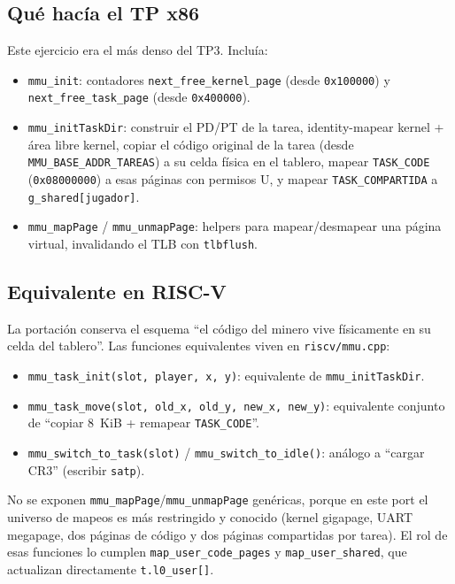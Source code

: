 \subsection{Qué hacía el TP x86}

Este ejercicio era el más denso del TP3. Incluía:

\begin{itemize}
  \item \texttt{mmu\_init}: contadores \texttt{next\_free\_kernel\_page} (desde \texttt{0x100000}) y
  \texttt{next\_free\_task\_page} (desde \texttt{0x400000}).
  \item \texttt{mmu\_initTaskDir}: construir el PD/PT de la tarea, identity-mapear kernel + área libre kernel, copiar el
  código original de la tarea (desde \texttt{MMU\_BASE\_ADDR\_TAREAS}) a su celda física en el tablero, mapear
  \texttt{TASK\_CODE} (\texttt{0x08000000}) a esas páginas con permisos U, y mapear \texttt{TASK\_COMPARTIDA} a
  \texttt{g\_shared[jugador]}.
  \item \texttt{mmu\_mapPage} / \texttt{mmu\_unmapPage}: helpers para mapear/desmapear una página virtual, invalidando
  el TLB con \texttt{tlbflush}.
\end{itemize}

\subsection{Equivalente en RISC-V}

La portación conserva el esquema ``el código del minero vive físicamente en su celda del tablero''. Las funciones
equivalentes viven en \texttt{riscv/mmu.cpp}:

\begin{itemize}
  \item \texttt{mmu\_task\_init(slot, player, x, y)}: equivalente de \texttt{mmu\_initTaskDir}.
  \item \texttt{mmu\_task\_move(slot, old\_x, old\_y, new\_x, new\_y)}: equivalente conjunto de ``copiar 8~KiB +
  remapear \texttt{TASK\_CODE}''.
  \item \texttt{mmu\_switch\_to\_task(slot)} / \texttt{mmu\_switch\_to\_idle()}: análogo a ``cargar CR3'' (escribir
  \texttt{satp}).
\end{itemize}

No se exponen \texttt{mmu\_mapPage}/\texttt{mmu\_unmapPage} genéricas, porque en este port el universo de mapeos es más
restringido y conocido (kernel gigapage, UART megapage, dos páginas de código y dos páginas compartidas por tarea). El
rol de esas funciones lo cumplen \texttt{map\_user\_code\_pages} y \texttt{map\_user\_shared}, que actualizan
directamente \texttt{t.l0\_user[]}.

